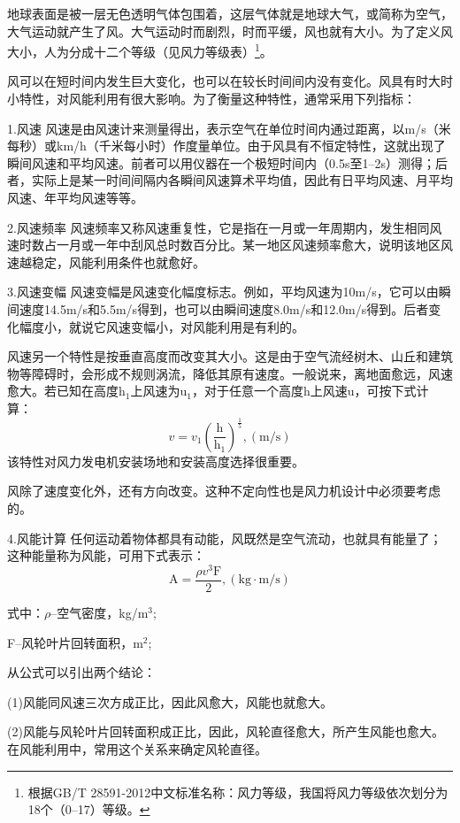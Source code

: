 \documentclass{ctexbook}
\begin{document}
地球表面是被一层无色透明气体包围着，这层气体就是地球大气，或简称为空气，大气运动就产生了风。大气运动时而剧烈，时而平缓，风也就有大小。为了定义风大小，人为分成十二个等级（见风力等级表）\footnote{根据GB/T 28591-2012中文标准名称：风力等级，我国将风力等级依次划分为18个（0--17）等级。}。

风可以在短时间内发生巨大变化，也可以在较长时间间内没有变化。风具有时大时小特性，对风能利用有很大影响。为了衡量这种特性，通常采用下列指标：

1.风速 风速是由风速计来测量得出，表示空气在单位时间内通过距离，以m/s（米每秒）或km/h（千米每小时）作度量单位。由于风具有不恒定特性，这就出现了瞬间风速和平均风速。前者可以用仪器在一个极短时间内（0.5s至1--2s）测得；后者，实际上是某一时间间隔内各瞬间风速算术平均值，因此有日平均风速、月平均风速、年平均风速等等。

2.风速频率 风速频率又称风速重复性，它是指在一月或一年周期内，发生相同风速时数占一月或一年中刮风总时数百分比。某一地区风速频率愈大，说明该地区风速越稳定，风能利用条件也就愈好。

3.风速变幅 风速变幅是风速变化幅度标志。例如，平均风速为10m/s，它可以由瞬间速度14.5m/s和5.5m/s得到，也可以由瞬间速度8.0m/s和12.0m/s得到。后者变化幅度小，就说它风速变幅小，对风能利用是有利的。

风速另一个特性是按垂直高度而改变其大小。这是由于空气流经树木、山丘和建筑物等障碍时，会形成不规则涡流，降低其原有速度。一般说来，离地面愈远，风速愈大。若已知在高度h$_1$上风速为u$_1$，对于任意一个高度h上风速u，可按下式计算：
\begin{equation*}
	v=v_{1}(\frac{\text{h}}{\text{h}_{1}})^{\frac{1}{5}} , (\text{m/s})
\end{equation*}
该特性对风力发电机安装场地和安装高度选择很重要。

风除了速度变化外，还有方向改变。这种不定向性也是风力机设计中必须要考虑的。

4.风能计算 任何运动着物体都具有动能，风既然是空气流动，也就具有能量了；这种能量称为风能，可用下式表示：
\begin{equation*}
	\text{A}=\frac{\rho v^{3}\text{F}}{2} ,(\text{kg}\cdot \text{m/s})
\end{equation*}

式中：$\rho$--空气密度，kg/m$^{3}$;

F--风轮叶片回转面积，m$^{2}$;

从公式可以引出两个结论：

(1)风能同风速三次方成正比，因此风愈大，风能也就愈大。

(2)风能与风轮叶片回转面积成正比，因此，风轮直径愈大，所产生风能也愈大。在风能利用中，常用这个关系来确定风轮直径。
\end{document}
